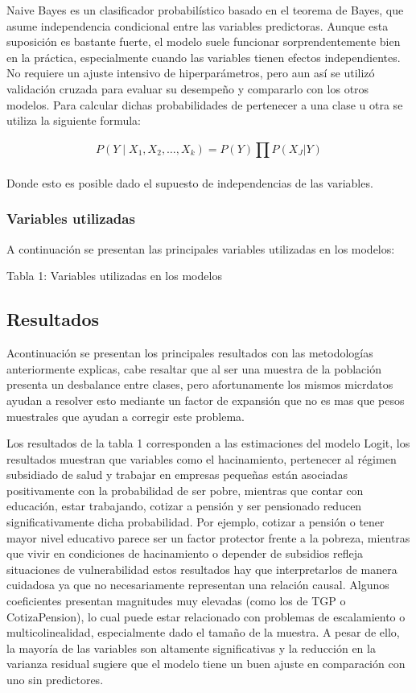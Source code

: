 \documentclass[12pt,a4paper,onecolumn]{article}
\begin{document}
Naive Bayes es un clasificador probabilístico basado en el teorema de Bayes, que asume independencia condicional entre las variables predictoras. Aunque esta suposición es bastante fuerte, el modelo suele funcionar sorprendentemente bien en la práctica, especialmente cuando las variables tienen efectos independientes. No requiere un ajuste intensivo de hiperparámetros, pero aun así se utilizó validación cruzada para evaluar su desempeño y compararlo con los otros modelos. Para calcular dichas probabilidades de pertenecer a una clase u otra se utiliza la siguiente formula:

$$P\left( Y \middle| X_{1},X_{2},\ldots,X_{k} \right) = P(Y)\prod_{}^{}{P(X_{J}|Y)}$$

Donde esto es posible dado el supuesto de independencias de las variables.

\subsubsection{Variables utilizadas}
A continuación se presentan las principales variables utilizadas en los modelos:

{\color{blue} Tabla 1: Variables utilizadas en los modelos}

\subsection{Resultados}

Acontinuación se presentan los principales resultados con las metodologías anteriormente explicas, cabe resaltar que al ser una muestra de la población presenta un desbalance entre clases, pero afortunamente los mismos micrdatos ayudan a resolver esto mediante un factor de expansión que no es mas que pesos muestrales que ayudan a corregir este problema.

Los resultados de la tabla 1 corresponden a las estimaciones del modelo Logit, los resultados muestran que variables como el hacinamiento, pertenecer al régimen subsidiado de salud y trabajar en empresas pequeñas están asociadas positivamente con la probabilidad de ser pobre, mientras que contar con educación, estar trabajando, cotizar a pensión y ser pensionado reducen significativamente dicha probabilidad. Por ejemplo, cotizar a pensión o tener mayor nivel educativo parece ser un factor protector frente a la pobreza, mientras que vivir en condiciones de hacinamiento o depender de subsidios refleja situaciones de vulnerabilidad estos resultados hay que interpretarlos de manera cuidadosa ya que no necesariamente representan una relación causal. Algunos coeficientes presentan magnitudes muy elevadas (como los de TGP o CotizaPension), lo cual puede estar relacionado con problemas de escalamiento o multicolinealidad, especialmente dado el tamaño de la muestra. A pesar de ello, la mayoría de las variables son altamente significativas y la reducción en la varianza residual sugiere que el modelo tiene un buen ajuste en comparación con uno sin predictores.
\end{document}
